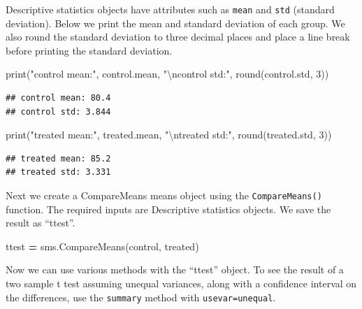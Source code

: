\documentclass[
]{book}
\newenvironment{Shaded}{\begin{snugshade}}{\end{snugshade}}
\newcommand{\BuiltInTok}[1]{#1}
\newcommand{\CharTok}[1]{\textcolor[rgb]{0.31,0.60,0.02}{#1}}
\newcommand{\DecValTok}[1]{\textcolor[rgb]{0.00,0.00,0.81}{#1}}
\newcommand{\NormalTok}[1]{#1}
\newcommand{\OperatorTok}[1]{\textcolor[rgb]{0.81,0.36,0.00}{\textbf{#1}}}
\newcommand{\StringTok}[1]{\textcolor[rgb]{0.31,0.60,0.02}{#1}}
\begin{document}
Descriptive statistics objects have attributes such as \texttt{mean} and \texttt{std} (standard deviation). Below we print the mean and standard deviation of each group. We also round the standard deviation to three decimal places and place a line break before printing the standard deviation.

\begin{Shaded}
\begin{Highlighting}[]
\BuiltInTok{print}\NormalTok{(}\StringTok{"control mean:"}\NormalTok{, control.mean, }\StringTok{"}\CharTok{\textbackslash{}n}\StringTok{control std:"}\NormalTok{, }\BuiltInTok{round}\NormalTok{(control.std, }\DecValTok{3}\NormalTok{))}
\end{Highlighting}
\end{Shaded}

\begin{verbatim}
## control mean: 80.4 
## control std: 3.844
\end{verbatim}

\begin{Shaded}
\begin{Highlighting}[]
\BuiltInTok{print}\NormalTok{(}\StringTok{"treated mean:"}\NormalTok{, treated.mean, }\StringTok{"}\CharTok{\textbackslash{}n}\StringTok{treated std:"}\NormalTok{, }\BuiltInTok{round}\NormalTok{(treated.std, }\DecValTok{3}\NormalTok{))}
\end{Highlighting}
\end{Shaded}

\begin{verbatim}
## treated mean: 85.2 
## treated std: 3.331
\end{verbatim}

Next we create a CompareMeans means object using the \texttt{CompareMeans()} function. The required inputs are Descriptive statistics objects. We save the result as ``ttest''.

\begin{Shaded}
\begin{Highlighting}[]
\NormalTok{ttest }\OperatorTok{=}\NormalTok{ sms.CompareMeans(control, treated)}
\end{Highlighting}
\end{Shaded}

Now we can use various methods with the ``ttest'' object. To see the result of a two sample t test assuming unequal variances, along with a confidence interval on the differences, use the \texttt{summary} method with \texttt{usevar=\textquotesingle{}unequal\textquotesingle{}}.
\end{document}
